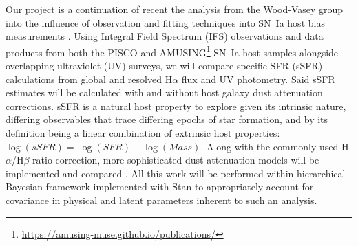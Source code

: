 \documentclass[modern]{aastex63}
\begin{document}
Our project is a continuation of recent the analysis from the Wood-Vasey group into the influence of observation and fitting techniques into SN~Ia host bias measurements \citep{Hand2021}.
Using Integral Field Spectrum (IFS) observations and data products from both the PISCO \citep{Galbany2018} and AMUSING\footnote{\url{https://amusing-muse.github.io/publications/}} SN~Ia host samples alongside overlapping ultraviolet (UV) surveys, we will compare specific SFR (sSFR) calculations from global and resolved H$\alpha$ flux and UV photometry.
Said sSFR estimates will be calculated with and without host galaxy dust attenuation corrections.
sSFR is a natural host property to explore given its intrinsic nature, differing observables that trace differing epochs of star formation, and by its definition being a linear combination of extrinsic host properties: $\log(sSFR) = \log(SFR) - \log(Mass)$.
Along with the commonly used H$\alpha$/H$\beta$ ratio correction, more sophisticated dust attenuation models will be implemented and compared \citep{Salim2018,Narayanan2018}.  
All this work will be performed within hierarchical Bayesian framework implemented with Stan to appropriately account for covariance in physical and latent parameters inherent to such an analysis.





\end{document}
